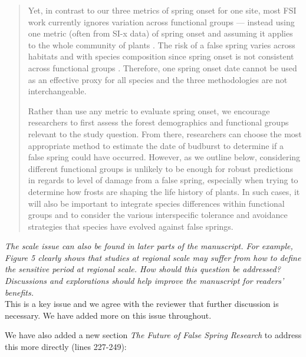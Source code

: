 \documentclass[11pt,a4paper]{article}
\begin{document}
\begin{quotation}
Yet, in contrast to our three metrics of spring onset for one site, most FSI work currently ignores variation across functional groups --- instead using one metric (often from SI-x data) of spring onset and assuming it applies to the whole community of plants \citep{Allstadt2015, Marino2011, Mehdipoor2017, Peterson2014}. The risk of a false spring varies across habitats and with species composition since spring onset is not consistent across functional groups \citep{Martin2010}. Therefore, one spring onset date cannot be used as an effective proxy for all species and the three methodologies are not interchangeable. 

Rather than use any metric to evaluate spring onset, we encourage researchers to first assess the forest demographics and functional groups relevant to the study question. From there, researchers can choose the most appropriate method to estimate the date of budburst to determine if a false spring could have occurred. However, as we outline below, considering different functional groups is unlikely to be enough for robust predictions in regards to level of damage from a false spring, especially when trying to determine how frosts are shaping the life history of plants. In such cases, it will also be important to integrate species differences within functional groups and to consider the various interspecific tolerance and avoidance strategies that species have evolved against false springs. 
\end{quotation}


\textit{The scale issue can also be found in later parts of the manuscript. For example, Figure 5 clearly shows that studies at regional scale may suffer from how to define the sensitive period at regional scale. How should this question be addressed? Discussions and explorations should help improve the manuscript for readers' benefits.} \\

This is a key issue and we agree with the reviewer that further discussion is necessary. We have added more on this issue throughout. %

We have also added a new section \textit{The Future of False Spring Research} to address this more directly (lines 227-249):\\
\end{document}
